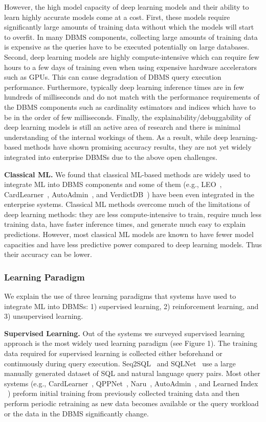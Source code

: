 However, the high model capacity of deep learning models and their ability to learn highly accurate models come at a cost.
First, these models require significantly large amounts of training data without which the models will start to overfit. In many DBMS components, collecting large amounts of training data is expensive as the queries have to be executed potentially on large databases.
Second, deep learning models are highly compute-intensive which can require few hours to a few days of training even when using expensive hardware accelerators such as GPUs. This can cause degradation of DBMS query execution performance.
Furthermore, typically deep learning inference times are in few hundreds of milliseconds and do not match with the performance requirements of the DBMS components such as cardinality estimators and indices which have to be in the order of few milliseconds.
Finally, the explainability/debuggability of deep learning models is still an active area of research and there is minimal understanding of the internal workings of them.
As a result, while deep learning-based methods have shown promising accuracy results, they are not yet widely integrated into enterprise DBMSs due to the above open challenges.


\vspace{2mm}
\noindent \textbf{Classical ML.} We found that classical ML-based methods are widely used to integrate ML into DBMS components and some of them (e.g., LEO~\cite{leo}, CardLearner~\cite{cardlearner}, AutoAdmin~\cite{autoadmin}, and VerdictDB~\cite{verdict}) have been even integrated in the enterprise systems.
Classical ML methods overcome much of the limitations of deep learning methods: they are less compute-intensive to train, require much less training data, have faster inference times, and generate much easy to explain predictions.
However, most classical ML models are known to have fewer model capacities and have less predictive power compared to deep learning models. Thus their accuracy can be lower.


\subsubsection{Learning Paradigm}
We explain the use of three learning paradigms that systems have used to integrate ML into DBMSs: 1) supervised learning, 2) reinforcement learning, and 3) unsupervised learning.

\vspace{2mm}
\noindent \textbf{Supervised Learning.} Out of the systems we surveyed supervised learning approach is the most widely used learning paradigm (see Figure 1).
The training data required for supervised learning is collected either beforehand or continuously during query execution.
Seq2SQL~\cite{seq2sql} and SQLNet~\cite{sqlnet} use a large manually generated dataset of SQL and natural language query pairs.
Most other systems (e.g., CardLearner~\cite{cardlearner}, QPPNet~\cite{qppnet}, Naru~\cite{naru}, AutoAdmin~\cite{autoadmin, autoadmin_2}, and Learned Index ~\cite{learnedindex}) preform initial training from previously collected training data and then perform periodic retraining as new data becomes available or the query workload or the data in the DBMS significantly change.

